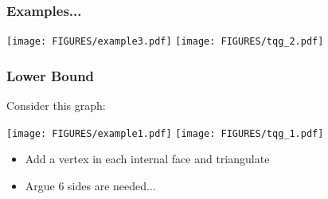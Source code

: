 \documentclass{beamer}
\begin{document}
\begin{frame}[plain]
\frametitle{Examples...}
\begin{center}
\texttt{[image: FIGURES/example3.pdf]}
\texttt{[image: FIGURES/tqg\_2.pdf]}
 \end{center}
\end{frame}

\begin{frame}[plain]
\frametitle{Lower Bound}
Consider this graph:
\begin{center}
\texttt{[image: FIGURES/example1.pdf]}
\texttt{[image: FIGURES/tqg\_1.pdf]}
 \end{center}
\begin{itemize}
\item Add a vertex in each internal face and triangulate
\item Argue 6 sides are needed...
\end{itemize}

\end{frame}
\end{document}

